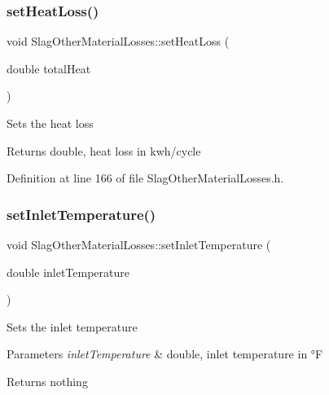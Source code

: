 \subsubsection{\texorpdfstring{set\+Heat\+Loss()}{setHeatLoss()}\hspace{0.1cm}{\footnotesize\ttfamily [3/3]}}
{\footnotesize\ttfamily void Slag\+Other\+Material\+Losses\+::set\+Heat\+Loss (\begin{DoxyParamCaption}\item[{double}]{total\+Heat }\end{DoxyParamCaption})\hspace{0.3cm}{\ttfamily [inline]}}

Sets the heat loss

\begin{DoxyReturn}{Returns}
double, heat loss in kwh/cycle 
\end{DoxyReturn}


Definition at line 166 of file Slag\+Other\+Material\+Losses.\+h.

\mbox{\label{class_slag_other_material_losses_a47bb0a61de501e3e9b7bd2bf2651eb8c}} 
\subsubsection{\texorpdfstring{set\+Inlet\+Temperature()}{setInletTemperature()}\hspace{0.1cm}{\footnotesize\ttfamily [1/3]}}
{\footnotesize\ttfamily void Slag\+Other\+Material\+Losses\+::set\+Inlet\+Temperature (\begin{DoxyParamCaption}\item[{double}]{inlet\+Temperature }\end{DoxyParamCaption})\hspace{0.3cm}{\ttfamily [inline]}}

Sets the inlet temperature


\begin{DoxyParams}{Parameters}
{\em inlet\+Temperature} & double, inlet temperature in °F\\
\hline
\end{DoxyParams}
\begin{DoxyReturn}{Returns}
nothing 
\end{DoxyReturn}


